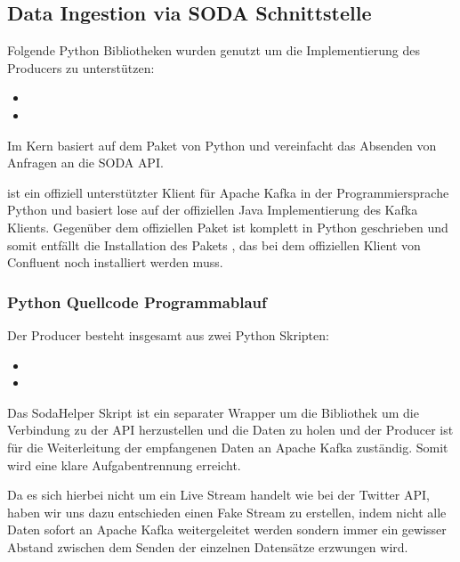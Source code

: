 \subsection{Data Ingestion via \acs{SODA} Schnittstelle}

Folgende Python Bibliotheken wurden genutzt um die Implementierung des Producers zu unterstützen:

\begin{itemize}
  \item {}
  \item {}
\end{itemize}

Im Kern basiert  auf dem  Paket von Python und vereinfacht das Absenden von Anfragen an die \ac{SODA} \ac{API}.\autocite{Sodapy}

 ist ein offiziell unterstützter Klient für Apache Kafka in der Programmiersprache Python und basiert lose auf der offiziellen Java Implementierung des Kafka Klients.\autocite{KafkaPython}
Gegenüber dem offiziellen Paket  ist  komplett in Python geschrieben und somit entfällt die Installation des Pakets 
, das bei dem offiziellen Klient von Confluent noch installiert werden muss.\autocite{KafkaClients}

\subsubsection{Python Quellcode Programmablauf}
Der Producer besteht insgesamt aus zwei Python Skripten:

\begin{itemize}
  \item {}
  \item {}
\end{itemize}

Das SodaHelper Skript ist ein separater Wrapper um die  Bibliothek um die Verbindung zu der \ac{API} herzustellen und die Daten zu holen
und der Producer ist für die Weiterleitung der empfangenen Daten an Apache Kafka zuständig.
Somit wird eine klare Aufgabentrennung erreicht.

Da es sich hierbei nicht um ein Live Stream handelt wie \zb{} bei der Twitter \ac{API}, haben wir uns dazu entschieden einen \glqq Fake Stream\grqq{} zu erstellen,
indem nicht alle Daten sofort an Apache Kafka weitergeleitet werden sondern immer ein gewisser Abstand zwischen dem Senden der einzelnen Datensätze
erzwungen wird.


